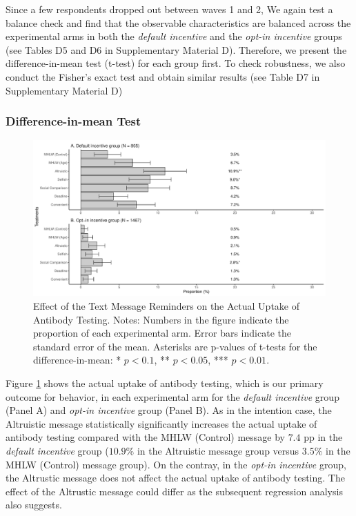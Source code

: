 \documentclass[
  11pt,
  a4paper
]{article}
\begin{document}
Since a few respondents dropped out between waves 1 and 2, We again test a balance check and find that the observable characteristics are balanced across the experimental arms in both the \emph{default incentive} and the \emph{opt-in incentive} groups (see Tables D5 and D6 in Supplementary Material D). Therefore, we present the difference-in-mean test (t-test) for each group first. To check robustness, we also conduct the Fisher's exact test and obtain similar results (see Table D7 in Supplementary Material D)

\hypertarget{difference-in-mean-test-1}{%
\subsubsection{Difference-in-mean Test}\label{difference-in-mean-test-1}}

\begin{figure}[t]
\includegraphics{Main-Document-LaTeX_files/figure-latex/ttest-act-test-1} \caption{Effect of the Text Message Reminders on the Actual Uptake of Antibody Testing. Notes: Numbers in the figure indicate the proportion of each experimental arm. Error bars indicate the standard error of the mean. Asterisks are p-values of t-tests for the difference-in-mean: * $p < 0.1$, ** $p < 0.05$, *** $p < 0.01$.}\label{fig:ttest-act-test}
\end{figure}

Figure \ref{fig:ttest-act-test} shows the actual uptake of antibody testing, which is our primary outcome for behavior, in each experimental arm for the \emph{default incentive} group (Panel A) and \emph{opt-in incentive} group (Panel B). As in the intention case, the Altruistic message statistically significantly increases the actual uptake of antibody testing compared with the MHLW (Control) message by \(7.4\) pp in the \emph{default incentive} group (\(10.9\)\% in the Altruistic message group versus \(3.5\)\% in the MHLW (Control) message group). On the contray, in the \emph{opt-in incentive} group, the Altrustic message does not affect the actual uptake of antibody testing. The effect of the Altrustic message could differ as the subsequent regression analysis also suggests.
\end{document}
